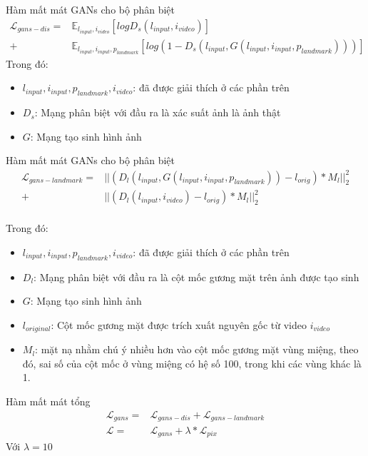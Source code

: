 \begin{frame}{Hàm mất mát GANs cho bộ phân biệt}
    \begin{equation}
        \begin{split}
        \mathcal{L}_{gans-dis} = &\mathbb{E}_{l_{input},i_{video}}[logD_s(l_{input},i_{video})]\\
        +&\mathbb{E}_{l_{input},i_{input},p_{landmark}}[log(1-D_s(l_{input},G(l_{input},i_{input},p_{landmark})))]
        \end{split}
    \end{equation}
    Trong đó:
    \begin{itemize}
        \item \textbf{$l_{input},i_{input},p_{landmark},i_{video}$}: đã được giải thích ở các phần trên
        \item \textbf{$D_s$}: Mạng phân biệt với đầu ra là xác suất ảnh là ảnh thật
        \item \textbf{$G$}: Mạng tạo sinh hình ảnh
    \end{itemize}
\end{frame}

\begin{frame}{Hàm mất mát GANs cho bộ phân biệt}
\begin{equation}
    \begin{split}
    \mathcal{L}_{gans-landmark} = &||(D_l(l_{input},G(l_{input},i_{input},p_{landmark})) - l_{orig})*M_l||^2_2\\
    +&||(D_l(l_{input},i_{video}) - l_{orig})*M_l||^2_2\\
    \end{split}
\end{equation}

    Trong đó:
    \begin{itemize}
        \item \textbf{$l_{input},i_{input},p_{landmark},i_{video}$}: đã được giải thích ở các phần trên
        \item \textbf{$D_l$}: Mạng phân biệt với đầu ra là cột mốc gương mặt trên ảnh được tạo sinh
        \item \textbf{$G$}: Mạng tạo sinh hình ảnh
        \item \textbf{$l_{original}$}: Cột mốc gương mặt được trích xuất nguyên gốc từ video $i_{video}$
        \item \textbf{$M_l$}: mặt nạ nhằm chú ý nhiều hơn vào cột mốc gương mặt vùng miệng, theo đó, sai số của cột mốc ở vùng miệng có hệ số 100, trong khi các vùng khác là 1.
    \end{itemize}
\end{frame}

\begin{frame}{Hàm mất mát tổng}
    \begin{equation}
        \begin{split}
        \mathcal{L}_{gans} = &\mathcal{L}_{gans-dis} + \mathcal{L}_{gans-landmark}\\
        \mathcal{L} = &\mathcal{L}_{gans} + \lambda*\mathcal{L}_{pix}
        \end{split}
    \end{equation}
    Với $\lambda = 10$
\end{frame}
